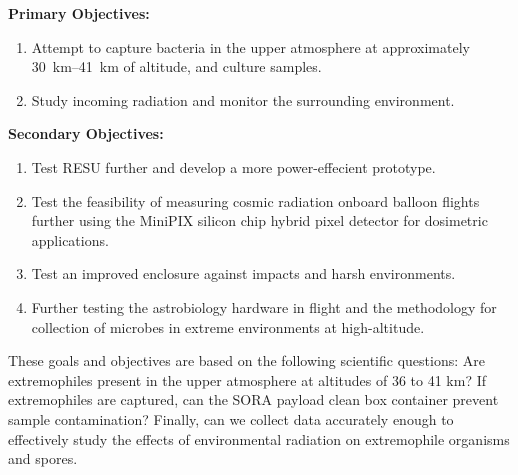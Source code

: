 {\bf Primary Objectives:}
	\begin{enumerate}
	\item Attempt to capture bacteria in the upper atmosphere at approximately \SIrange{30}{41}{\kilo\meter} of altitude, and culture samples.
	\item Study incoming radiation and monitor the surrounding environment.
	\end{enumerate}
{\bf Secondary Objectives:}
	\begin{enumerate}
	\item Test RESU further and develop a more power-effecient prototype.
	\item Test the feasibility of measuring cosmic radiation onboard balloon flights further using the MiniPIX silicon chip hybrid pixel detector for dosimetric applications.
	\item Test an improved enclosure against impacts and harsh environments.
	\item Further testing the astrobiology hardware in flight and the methodology for collection of microbes in extreme environments at high-altitude.
	\end{enumerate}


These goals and objectives are based on the following scientific questions: Are extremophiles present in the upper atmosphere at altitudes of 36 to 41 km?  If extremophiles are captured, can the SORA payload clean box container prevent sample contamination? Finally, can we collect data accurately enough to effectively study the effects of environmental radiation on extremophile organisms and spores.



